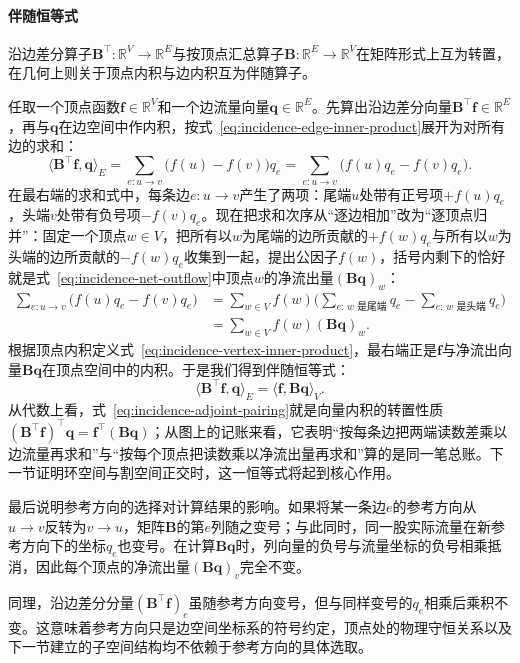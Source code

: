 \paragraph{伴随恒等式}

沿边差分算子$\bm{B}^\top\colon\mathbb{R}^V\to\mathbb{R}^E$与按顶点汇总算子$\bm{B}\colon\mathbb{R}^E\to\mathbb{R}^V$在矩阵形式上互为转置，在几何上则关于顶点内积与边内积互为伴随算子。

任取一个顶点函数$\bm{f}\in\mathbb{R}^V$和一个边流量向量$\bm{q}\in\mathbb{R}^E$。先算出沿边差分向量$\bm{B}^\top\bm{f}\in\mathbb{R}^E$，再与$\bm{q}$在边空间中作内积，按式~\eqref{eq:incidence-edge-inner-product}展开为对所有边的求和：
\[
\langle\bm{B}^\top\bm{f},\bm{q}\rangle_E
=\sum_{e\colon u\to v}\bigl(f(u)-f(v)\bigr)q_e
=\sum_{e\colon u\to v}\bigl(f(u)q_e-f(v)q_e\bigr).
\]
在最右端的求和式中，每条边$e\colon u\to v$产生了两项：尾端$u$处带有正号项$+f(u)q_e$，头端$v$处带有负号项$-f(v)q_e$。现在把求和次序从“逐边相加”改为“逐顶点归并”：固定一个顶点$w\in V$，把所有以$w$为尾端的边所贡献的$+f(w)q_e$与所有以$w$为头端的边所贡献的$-f(w)q_e$收集到一起，提出公因子$f(w)$，括号内剩下的恰好就是式~\eqref{eq:incidence-net-outflow}中顶点$w$的净流出量$(\bm{B}\bm{q})_w$：
\[
\begin{aligned}
\sum_{e\colon u\to v}\bigl(f(u)q_e-f(v)q_e\bigr)
&=\sum_{w\in V}f(w)\Biggl(\sum_{e:\,w\text{ 是尾端}}q_e-\sum_{e:\,w\text{ 是头端}}q_e\Biggr)\\
&=\sum_{w\in V}f(w)(\bm{B}\bm{q})_w.
\end{aligned}
\]
根据顶点内积定义式~\eqref{eq:incidence-vertex-inner-product}，最右端正是$\bm{f}$与净流出向量$\bm{B}\bm{q}$在顶点空间中的内积。于是我们得到伴随恒等式：
\begin{equation}
\langle\bm{B}^\top\bm{f},\bm{q}\rangle_E
=\langle\bm{f},\bm{B}\bm{q}\rangle_V.
\label{eq:incidence-adjoint-pairing}
\end{equation}
从代数上看，式~\eqref{eq:incidence-adjoint-pairing}就是向量内积的转置性质$(\bm{B}^\top\bm{f})^\top\bm{q}=\bm{f}^\top(\bm{B}\bm{q})$；从图上的记账来看，它表明“按每条边把两端读数差乘以边流量再求和”与“按每个顶点把读数乘以净流出量再求和”算的是同一笔总账。下一节证明环空间与割空间正交时，这一恒等式将起到核心作用。

最后说明参考方向的选择对计算结果的影响。如果将某一条边$e$的参考方向从$u\to v$反转为$v\to u$，矩阵$\bm{B}$的第$e$列随之变号；与此同时，同一股实际流量在新参考方向下的坐标$q_e$也变号。在计算$\bm{B}\bm{q}$时，列向量的负号与流量坐标的负号相乘抵消，因此每个顶点的净流出量$(\bm{B}\bm{q})_v$完全不变。

同理，沿边差分分量$(\bm{B}^\top\bm{f})_e$虽随参考方向变号，但与同样变号的$q_e$相乘后乘积不变。这意味着参考方向只是边空间坐标系的符号约定，顶点处的物理守恒关系以及下一节建立的子空间结构均不依赖于参考方向的具体选取。
